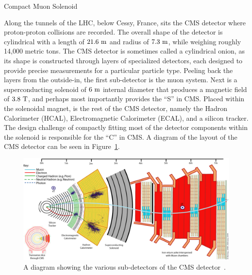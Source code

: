 \begin{section}{Compact Muon Solenoid}

Along the tunnels of the LHC, below Cessy, France, sits the CMS detector where proton-proton collisions are recorded.
The overall shape of the detector is cylindrical with a length of $21.6~\mathrm{m}$ and radius of $7.3~\mathrm{m}$, while weighing roughly 14,000 metric tons.
The CMS detector is sometimes called a cylindrical onion, as its shape is constructed through layers of specialized detectors, each designed to provide precise measurements for a particular particle type.
Peeling back the layers from the outside-in, the first sub-detector is the muon system. 
Next is a superconducting solenoid of $6~\mathrm{m}$ internal diameter that produces a magnetic field of $3.8~\mathrm{T}$, and perhaps most importantly provides the ``S'' in CMS.
Placed within the solenoidal magnet, is the rest of the CMS detector, namely the Hadron Calorimeter (HCAL), Electromagnetic Calorimeter (ECAL), and a silicon tracker.
The design challenge of compactly fitting most of the detector components within the solenoid is responsible for the ``C'' in CMS.
A diagram of the layout of the CMS detector can be seen in Figure~\ref{fig:cms_detector}.

\begin{figure}[tbp!]
\begin{center}
\includegraphics[angle=0,width=0.90\columnwidth]{fig/cms_detector.jpg}
\end{center}
\caption{A diagram showing the various sub-detectors of the CMS detector~\cite{10.1088/978-1-6817-4078-2ch4}.}
\label{fig:cms_detector}
\end{figure}


\end{section}
